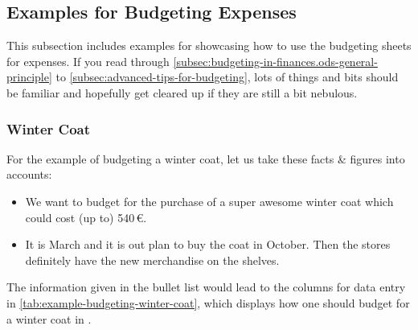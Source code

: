 \subsection{Examples for Budgeting Expenses}
\label{subsec:examples-budgeting-expenses}

This subsection includes examples for showcasing how to use the budgeting sheets for expenses.
If you read through \autoref{subsec:budgeting-in-finances.ods-general-principle} to \autoref{subsec:advanced-tips-for-budgeting}, lots of things and bits should be familiar and hopefully get cleared up if they are still a bit nebulous.

\subsubsection{Winter Coat}
\label{subsubsec:example-budgeting-winter-coat}

For the example of budgeting a winter coat, let us take these facts \& figures into accounts:
\begin{itemize}
	\item We want to budget for the purchase of a super awesome winter coat which could cost (up to) 540\,€.
	\item It is March and it is out plan to buy the coat in October.
	Then the stores definitely have the new merchandise on the shelves.
\end{itemize}

The information given in the bullet list would lead to the columns for data entry in \autoref{tab:example-budgeting-winter-coat}, which displays how one should budget for a winter coat in \tfn.

